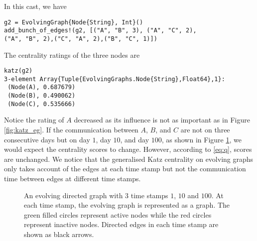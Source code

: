 \documentclass[12pt]{article}
\theoremstyle{definition}
\begin{document}
In this cast, we have
\begin{lstlisting}
g2 = EvolvingGraph{Node{String}, Int}()
add_bunch_of_edges!(g2, [("A", "B", 3), ("A", "C", 2),
("A", "B", 2),("C", "A", 2),("B", "C", 1)])
\end{lstlisting}

The centrality ratings of the three nodes are

\begin{lstlisting}
katz(g2)
3-element Array{Tuple{EvolvingGraphs.Node{String},Float64},1}:
 (Node(A), 0.687679)
 (Node(B), 0.490062)
 (Node(C), 0.535666)
\end{lstlisting}

Notice the rating of $A$ decreased as its influence is not as important as in Figure \ref{fig:katz_eg}.
If the communication between $A$, $B$, and $C$ are not on three consecutive days
but on day $1$, day $10$, and day $100$, as shown in Figure \ref{fig:katz_eg3},
we would expect the centrality scores to change. However, according to \eqref{eq:q}, scores are unchanged.
We notice that the generalised Katz centrality on evolving graphs only takes account of the edges at each time stamp but not the communication time between edges at different time stamps.

\begin{figure}[h]
 \begin{center}
\end{center}
\caption{An evolving directed graph with 3 time stamps $1$, $10$ and $100$.
At each time stamp, the evolving graph is represented as a graph.
The green filled circles represent active nodes while the red circles represent
inactive nodes. Directed edges in each time stamp are shown as black arrows.}
\label{fig:katz_eg3}
\end{figure}
\end{document}
